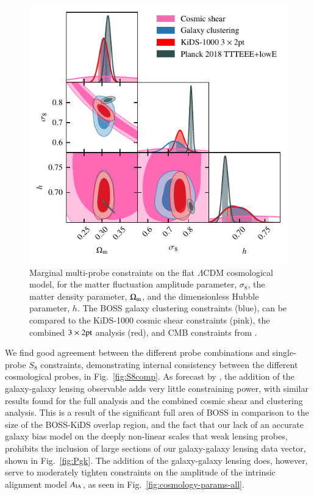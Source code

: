 \begin{figure}
	\begin{center}
		\includegraphics[width=\columnwidth]{Parameter_Plots/cosmology/omegam_sigma8_h_blind_C}
		\caption{Marginal multi-probe constraints on the flat $\Lambda$CDM cosmological model, for the matter fluctuation amplitude parameter, $\sigma_8$, the matter density parameter, $\Omega_{\rm m}$, and the dimensionless Hubble parameter, $h$.  The BOSS galaxy clustering constraints (blue), can be compared to the KiDS-1000 cosmic shear constraints (pink), the combined $3\times2{\rm pt}$ analysis (red), and CMB constraints from \citet[][grey]{planck/etal:2018}.}
		\label{fig:cosmology-params}
	\end{center}
\end{figure}

We find good agreement between the different probe combinations and single-probe $S_8$ constraints, demonstrating internal consistency between the different cosmological probes, in Fig.~\ref{fig:S8comp}.  
As forecast by \citet{joachimi/etal:inprep}, the addition of the galaxy-galaxy lensing observable adds very little constraining power, with similar results found for the full \tttp analysis and the combined cosmic shear and clustering analysis. 
This is a result of the significant full area of BOSS in comparison to the size of the BOSS-KiDS overlap region, and the fact that our lack of an accurate galaxy bias model on the deeply non-linear scales that weak lensing probes,
prohibits the inclusion of large sections of our galaxy-galaxy lensing data vector, shown in Fig.~\ref{fig:Pgk}.  
The addition of the galaxy-galaxy lensing does, however, serve to moderately tighten constraints on the amplitude of the intrinsic alignment model $A_{\rm IA}$,  as seen in Fig.~\ref{fig:cosmology-params-all}. 

